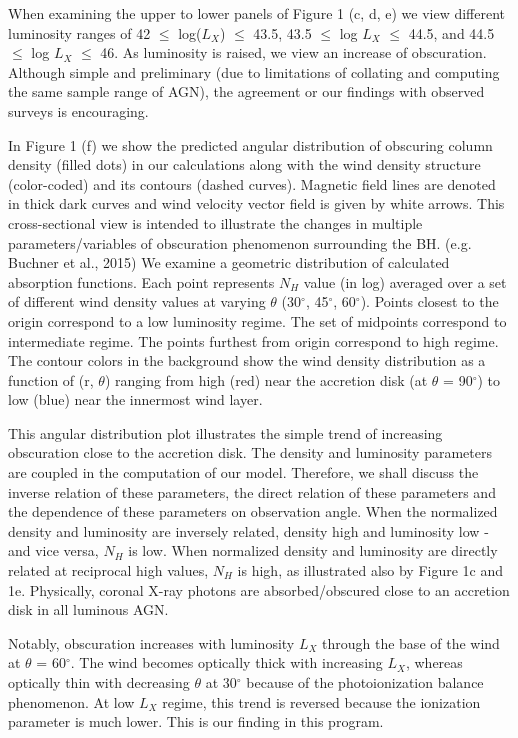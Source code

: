 \documentclass[12pt,linenumbers]{aastex631}
\begin{document}
	When examining the upper to lower panels of Figure 1 (c, d, e) we view different luminosity ranges of 42 $\leq$ log($L_X$) $\leq$ 43.5, 43.5 $\leq$  log $L_X$ $\leq$ 44.5, and 44.5 $\leq$ log $L_X$ $\leq$ 46.  As luminosity is raised, we view an increase of obscuration.  Although simple and preliminary (due to limitations of collating and computing the same sample range of AGN), the agreement or our findings with observed surveys is encouraging.  \par
	In Figure 1 (f) we show the predicted angular distribution of obscuring column density (filled dots) in our calculations along with the wind density structure (color-coded) and its contours (dashed curves).  Magnetic field lines are denoted in thick dark curves and wind velocity vector field is given by white arrows.  This cross-sectional view is intended to illustrate the changes in multiple parameters/variables of obscuration phenomenon surrounding the BH. (e.g. Buchner et al., 2015) We examine a geometric distribution of calculated absorption functions.  Each point represents $N_H$ value (in log) averaged over a set of different wind density values at varying $\theta$ (30$^{\circ}$, 45$^{\circ}$, 60$^{\circ}$).  Points closest to the origin correspond to a low luminosity regime.  The set of midpoints correspond to intermediate regime.  The points furthest from origin correspond to high regime.  The contour colors in the background show the wind density distribution as a function of (r, $\theta$) ranging from high (red) near the accretion disk (at  $\theta$ = 90$^{\circ}$) to low (blue) near the innermost wind layer.  \par
	This angular distribution plot illustrates the simple trend of increasing obscuration close to the accretion disk.  The density and luminosity parameters are coupled in the computation of our model.  Therefore, we shall discuss the inverse relation of these parameters, the direct relation of these parameters and the dependence of these parameters on observation angle.  When the normalized density and luminosity are inversely related, density high and luminosity low - and vice versa, $N_H$ is low.  When normalized density and luminosity are directly related at reciprocal high values, $N_H$ is high, as illustrated also by Figure 1c and 1e.  Physically, coronal X-ray photons are absorbed/obscured close to an accretion disk in all luminous AGN.\par
	Notably, obscuration increases with luminosity $L_X$ through the base of the wind at $\theta$ = 60$^{\circ}$.  The wind becomes optically thick with increasing $L_X$, whereas optically thin with decreasing $\theta$ at 30$^{\circ}$ because of the photoionization balance phenomenon.  At low $L_X$ regime, this trend is reversed because the ionization parameter is much lower.  This is our finding in this program.\par
\end{document}
